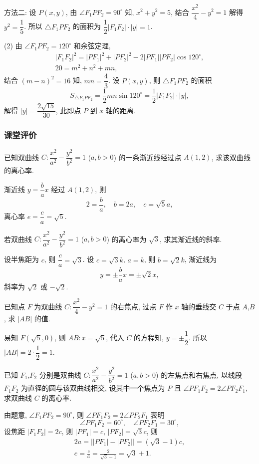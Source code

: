    方法二: 设 $P(x,y)$, 由 $\angle F_1PF_2= 90^\circ$ 知, $x^2+y^2= 5$, 结合 $\dfrac{x^2}4- y^2=1$ 解得 $y^2= \dfrac15$. 所以 $\triangle F_1PF_2$ 的面积为  $\dfrac12 |F_1F_2|\cdot |y|= 1$.

    (2) 由 $\angle F_1PF_2= 120^\circ$ 和余弦定理,
    \[\begin{gathered}
        |F_1F_2|^2= |PF_1|^2+ |PF_2|^2- 2|PF_1||PF_2|\cos 120^\circ,\\
        20= m^2+n^2+mn,
    \end{gathered}\]
    结合 $(m-n)^2= 16$ 知, $mn= \dfrac43$. 设 $P(x,y)$, 则  $\triangle F_1PF_2$ 的面积
    \[S_{\triangle F_1PF_2}
        = \frac12mn\sin 120^\circ
        = \dfrac12 |F_1F_2|\cdot |y|,\]
    解得 $|y|= \dfrac{2\sqrt{15}}{30}$, 此即点 $P$ 到 $x$ 轴的距离.
\endsolution

\subsubsection{课堂评价}  
\begin{exercise}
    已知双曲线 $C\colon \dfrac{x^2}{a^2}- \dfrac{y^2}{b^2}=1$ ($a,b>0$) 的一条渐近线经过点 $A(1, 2)$, 求该双曲线的离心率.
\end{exercise}
\beginsolution
    渐近线 $y= \dfrac{b}a x$ 经过 $A(1,2)$, 则
    \[2= \frac{b}a,\quad b= 2a,\quad c=\sqrt5 a,\]
    离心率 $e= \dfrac{c}a= \sqrt5$.
\endsolution

\begin{exercise}
    若双曲线 $C\colon \dfrac{x^2}{a^2}- \dfrac{y^2}{b^2}=1$ ($a,b>0$) 的离心率为 $\sqrt3$, 求其渐近线的斜率.
\end{exercise}
\beginsolution
    设半焦距为 $c$, 则 $\dfrac{c}a= \sqrt3$. 设 $c= \sqrt3k$, $a= k$, 则 $b= \sqrt2 k$, 渐近线为 
    \[y= \pm\frac{b}a x= \pm\sqrt2 x,\]
    斜率为 $\sqrt2$ 或 $-\sqrt2$.
\endsolution

\begin{exercise}
    已知点 $F$ 为双曲线 $C\colon \dfrac{x^2}4 -y^2= 1$ 的右焦点, 过点 $F$ 作 $x$ 轴的垂线交 $C$ 于点 $A$,$B$, 求 $|AB|$ 的值.
\end{exercise}
\beginsolution
    易知 $F(\sqrt5,0)$, 则 $AB\colon x=\sqrt5$, 代入 $C$ 的方程知, $y= \pm\dfrac12$. 所以 $|AB|= 2\cdot\dfrac12= 1$.
\endsolution

\begin{exercise}
    已知 $F_1$,$F_2$ 分别是双曲线 $C\colon \dfrac{x^2}{a^2}- \dfrac{y^2}{b^2}=1$ ($a,b>0$) 的左焦点和右焦点, 以线段 $F_1F_2$ 为直径的圆与该双曲线相交, 设其中一个焦点为 $P$ 且 $\angle PF_1F_2= 2\angle PF_2F_1$, 求双曲线 $C$ 的离心率.
\end{exercise}
\beginsolution
    由题意, $\angle F_1PF_2= 90^\circ$, 则 $\angle PF_1F_2= 2\angle PF_2F_1$ 表明
    \[\angle PF_1F_2= 60^\circ,\quad 
    \angle PF_2F_1= 30^\circ,\]
    设焦距 $|F_1F_2|= 2c$, 则 $|PF_1|= c$, $|PF_2|= \sqrt3c$, 则
    \[\begin{gathered}
        2a= \bigl||PF_1|-|PF_2|\bigr|= (\sqrt3-1)c,\\
        e= \frac{c}a= \frac2{\sqrt3-1}= \sqrt3+1.
    \end{gathered}\]
\endsolution


